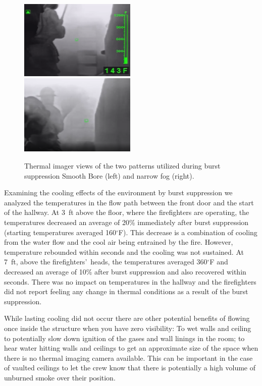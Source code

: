 \documentclass[12pt,oneside]{book}
\begin{document}
\begin{figure}[H]
\centering
\includegraphics[width=0.495\textwidth]{../0_Images/Tactical_Considerations/Burst_Suppression/Solid_Stream_Burst}
\includegraphics[width=0.495\textwidth]{../0_Images/Tactical_Considerations/Burst_Suppression/Fog_Burst}
\caption[Burst Suppression Example]{Thermal imager views of the two patterns utilized during burst suppression Smooth Bore (left) and narrow fog (right).}
\label{fig:tc_burst_supp_ir}
\end{figure}

Examining the cooling effects of the environment by burst suppression we analyzed the temperatures in the flow path between the front door and the start of the hallway.  At 3~ft above the floor, where the firefighters are operating, the temperatures decreased an average of 20\% immediately after burst suppression (starting temperatures averaged 160$^\circ$F).  This decrease is a combination of cooling from the water flow and the cool air being entrained by the fire.  However, temperature rebounded within seconds and the cooling was not sustained.  At 7~ft, above the firefighters\textquoteright \ heads, the temperatures averaged 360$^\circ$F and decreased an average of 10\% after burst suppression and also recovered within seconds.  There was no impact on temperatures in the hallway and the firefighters did not report feeling any change in thermal conditions as a result of the burst suppression.  

While lasting cooling did not occur there are other potential benefits of flowing once inside the structure when you have zero visibility: To wet walls and ceiling to potentially slow down ignition of the gases and wall linings in the room; to hear water hitting walls and ceilings to get an approximate size of the space when there is no thermal imaging camera available. This can be important in the case of vaulted ceilings to let the crew know that there is potentially a high volume of unburned smoke over their position. 
\end{document}
